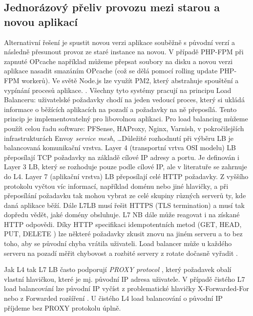         \subsection{Jednorázový přeliv provozu mezi starou a novou aplikací}
            Alternativní řešení je spustit novou verzi aplikace souběžně s původní verzí a následně přesunout provoz ze staré instance na novou. V případě PHP-FPM při zapnuté OPcache například můžeme přepsat soubory na disku a novou verzi aplikace nasadit smazáním OPcache (což se dělá pomocí rolling update PHP-FPM workerů). Ve světě Node.js lze využít PM2, který abstrahuje spouštění a vypínání procesů aplikace. . Všechny tyto systémy pracují na principu Load Balanceru: uživatelské požadavky chodí na jeden vedoucí proces, který si ukládá informace o běžících aplikacích na pozadí a požadavky na ně přeposílá. Tento princip je implementovatelný pro libovolnou aplikaci. Pro load balancing můžeme použít celou řadu software: PFSense, HAProxy, Nginx, Varnish, v pokročilejších infrastrukturách Envoy \textit{service mesh}, \ldots Důležité rozhodnutí při výběru LB je balancovaná komunikační vrstva. Layer 4 (transportní vrtva OSI modelu) LB přeposílají TCP požadavky na základě cílové IP adresy a portu. Je definován i Layer 3 LB, který se rozhoduje pouze podle cílové IP, ale v literatuře se zahrnuje do L4. Layer 7 (aplikační vrstva) LB přeposílají celé HTTP požadavky. Z vyššího protokolu vyčtou víc informací, například doménu nebo jiné hlavičky, a při přeposílání požadavku tak mohou vybrat ze celé skupiny různých serverů ty, kde daná aplikace běží. Dále L7LB musí řešit HTTPS (TLS termination) a musí tak dopředu vědět, jaké domény obsluhuje. L7 NB dále může reagovat i na získané HTTP odpovědi. Díky HTTP specifikaci idempotentních metod (GET, HEAD, PUT, DELETE \cite{http-idempotent}) lze některé požadavky zkusit znovu na jiném serveru a to bez toho, aby se původní chyba vrátila uživateli. Load balancer může u každého serveru na pozadí měřit chybovost a rozbité servery z rotate dočasně vyřadit .

            Jak L4 tak L7 LB často podporují \textit{PROXY protocol} \cite{tarreau-proxyprotocol}, který požadavek obalí vlastní hlavičkou, které je mj. původní IP adresa uživatele. V případě čistého L7 load balancování lze původní IP vyčíst z problematické \cite{hansen-xforwardedfor} hlavičky X-Forwarded-For nebo z Forwarded rozšíření \cite{http-forwarded}. U čistého L4 load balancování o původní IP příjdeme bez PROXY protokolu úplně.

